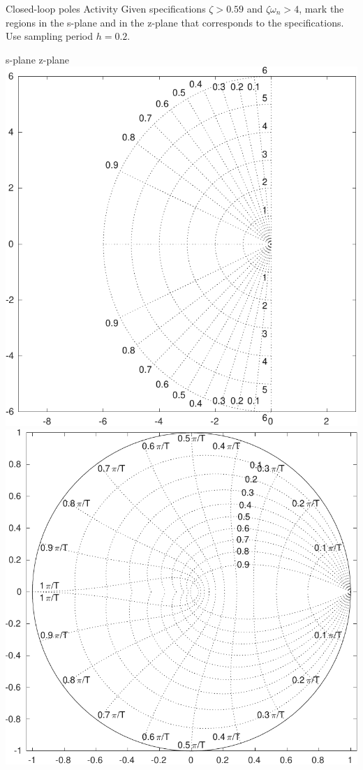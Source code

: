\documentclass[presentation,aspectratio=169]{beamer}
\begin{document}
\begin{frame}[label={sec:org59a4a22}]{Closed-loop poles}
\alert{Activity} Given specifications \(\zeta > 0.59\) and \(\zeta\omega_n > 4\), mark the regions in the s-plane and in the z-plane that corresponds to the specifications. Use sampling period \(h=0.2\).
\begin{center}
\alert{s-plane} \hspace*{0.4\linewidth} \alert{z-plane}\\
\includegraphics[height=0.61\textheight]{../../figures/sgrid-crop} \hspace*{3mm}
\includegraphics[height=0.6\textheight]{../../figures/zgrid-crop}\\
\end{center}
\end{frame}
\end{document}
